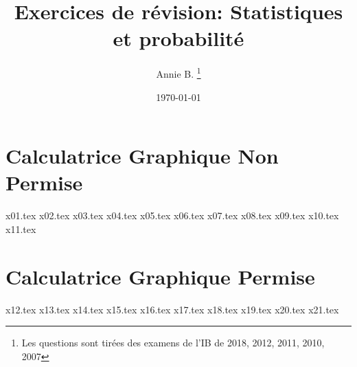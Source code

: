 \documentclass[10pt]{article}
\newcounter{question}
\begin{document}
 

\title{Exercices de révision: Statistiques et probabilité}
\author{Annie B. \thanks{Les questions sont tirées des examens de l’IB de 2018, 2012, 2011, 2010, 2007}}
\date{\today}
\maketitle
\newpage
\section*{\textbf{Calculatrice Graphique Non Permise}}
{x01.tex}
{x02.tex}
\newpage
{x03.tex}
{x04.tex}
\newpage
{x05.tex}
\newpage
{x06.tex}
\newpage
{x07.tex}
\newpage
{x08.tex}
\newpage
{x09.tex}
{x10.tex}
{x11.tex}
\newpage
\section*{\textbf{Calculatrice Graphique Permise}}
{x12.tex}
{x13.tex}
{x14.tex}
\newpage
{x15.tex}
{x16.tex}
{x17.tex}
\newpage
{x18.tex}
{x19.tex}
{x20.tex}
\newpage
{x21.tex}
\end{document}
